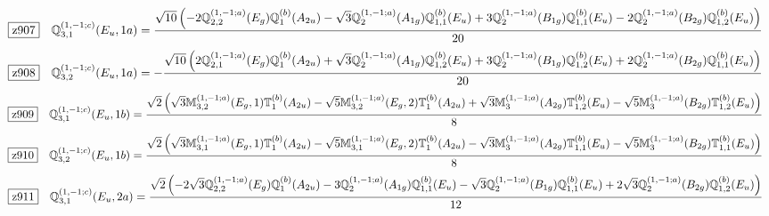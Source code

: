 \documentclass[fleqn,10pt,landscape]{jsarticle}
\begin{document}
\begin{dmath*}
\hspace*{3mm}\fbox{z907}\quad \mathbb{Q}_{3,1}^{(1,-1;c)}(E_{u},1a)=\frac{\sqrt{10} \left(- 2 \mathbb{Q}_{2,2}^{(1,-1;a)}(E_{g}) \mathbb{Q}_{1}^{(b)}(A_{2u}) - \sqrt{3} \mathbb{Q}_{2}^{(1,-1;a)}(A_{1g}) \mathbb{Q}_{1,1}^{(b)}(E_{u}) + 3 \mathbb{Q}_{2}^{(1,-1;a)}(B_{1g}) \mathbb{Q}_{1,1}^{(b)}(E_{u}) - 2 \mathbb{Q}_{2}^{(1,-1;a)}(B_{2g}) \mathbb{Q}_{1,2}^{(b)}(E_{u})\right)}{20}
\end{dmath*}
\begin{dmath*}
\hspace*{3mm}\fbox{z908}\quad \mathbb{Q}_{3,2}^{(1,-1;c)}(E_{u},1a)=- \frac{\sqrt{10} \left(2 \mathbb{Q}_{2,1}^{(1,-1;a)}(E_{g}) \mathbb{Q}_{1}^{(b)}(A_{2u}) + \sqrt{3} \mathbb{Q}_{2}^{(1,-1;a)}(A_{1g}) \mathbb{Q}_{1,2}^{(b)}(E_{u}) + 3 \mathbb{Q}_{2}^{(1,-1;a)}(B_{1g}) \mathbb{Q}_{1,2}^{(b)}(E_{u}) + 2 \mathbb{Q}_{2}^{(1,-1;a)}(B_{2g}) \mathbb{Q}_{1,1}^{(b)}(E_{u})\right)}{20}
\end{dmath*}
\begin{dmath*}
\hspace*{3mm}\fbox{z909}\quad \mathbb{Q}_{3,1}^{(1,-1;c)}(E_{u},1b)=\frac{\sqrt{2} \left(\sqrt{3} \mathbb{M}_{3,2}^{(1,-1;a)}(E_{g},1) \mathbb{T}_{1}^{(b)}(A_{2u}) - \sqrt{5} \mathbb{M}_{3,2}^{(1,-1;a)}(E_{g},2) \mathbb{T}_{1}^{(b)}(A_{2u}) + \sqrt{3} \mathbb{M}_{3}^{(1,-1;a)}(A_{2g}) \mathbb{T}_{1,2}^{(b)}(E_{u}) - \sqrt{5} \mathbb{M}_{3}^{(1,-1;a)}(B_{2g}) \mathbb{T}_{1,2}^{(b)}(E_{u})\right)}{8}
\end{dmath*}
\begin{dmath*}
\hspace*{3mm}\fbox{z910}\quad \mathbb{Q}_{3,2}^{(1,-1;c)}(E_{u},1b)=\frac{\sqrt{2} \left(\sqrt{3} \mathbb{M}_{3,1}^{(1,-1;a)}(E_{g},1) \mathbb{T}_{1}^{(b)}(A_{2u}) - \sqrt{5} \mathbb{M}_{3,1}^{(1,-1;a)}(E_{g},2) \mathbb{T}_{1}^{(b)}(A_{2u}) - \sqrt{3} \mathbb{M}_{3}^{(1,-1;a)}(A_{2g}) \mathbb{T}_{1,1}^{(b)}(E_{u}) - \sqrt{5} \mathbb{M}_{3}^{(1,-1;a)}(B_{2g}) \mathbb{T}_{1,1}^{(b)}(E_{u})\right)}{8}
\end{dmath*}
\begin{dmath*}
\hspace*{3mm}\fbox{z911}\quad \mathbb{Q}_{3,1}^{(1,-1;c)}(E_{u},2a)=\frac{\sqrt{2} \left(- 2 \sqrt{3} \mathbb{Q}_{2,2}^{(1,-1;a)}(E_{g}) \mathbb{Q}_{1}^{(b)}(A_{2u}) - 3 \mathbb{Q}_{2}^{(1,-1;a)}(A_{1g}) \mathbb{Q}_{1,1}^{(b)}(E_{u}) - \sqrt{3} \mathbb{Q}_{2}^{(1,-1;a)}(B_{1g}) \mathbb{Q}_{1,1}^{(b)}(E_{u}) + 2 \sqrt{3} \mathbb{Q}_{2}^{(1,-1;a)}(B_{2g}) \mathbb{Q}_{1,2}^{(b)}(E_{u})\right)}{12}
\end{dmath*}
\end{document}
